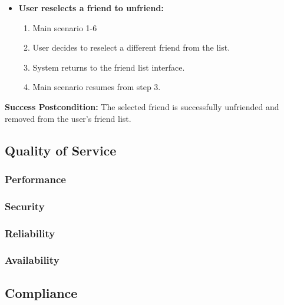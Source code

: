 \documentclass{article}
\begin{document}
\begin{enumerate}[label=\textbf{UC\arabic*}]
\begin{itemize}
            \item[{}] \textbf{User reselects a friend to unfriend:}
            \begin{enumerate}[label=\textbf{\arabic*.}]
                \item Main scenario 1-6
                \item User decides to reselect a different friend from the list.
                \item System returns to the friend list interface.
                \item Main scenario resumes from step 3.
            \end{enumerate}
        \end{itemize}
        
        \textbf{Success Postcondition:} The selected friend is successfully unfriended and removed from the user's friend list.

\end{enumerate}

\subsection{Quality of Service}

\subsubsection{Performance}


\subsubsection{Security}


\subsubsection{Reliability}


\subsubsection{Availability}


\subsection{Compliance}
\label{sub:compliance}
\end{document}
